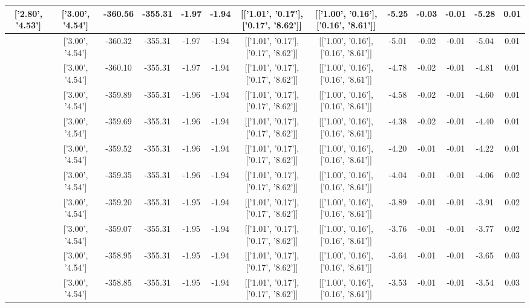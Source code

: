\begin{table}[htbp]
\begin{adjustbox}{angle=90}
\begin{tabular}{|c|c|c|c|c|c|c|c|c|c|c|c|c|}
 ['2.80', '4.53'] & ['3.00', '4.54'] & -360.56 & -355.31 & -1.97 & -1.94 & [['1.01', '0.17'], ['0.17', '8.62']] & [['1.00', '0.16'], ['0.16', '8.61']] & -5.25 & -0.03 & -0.01 & -5.28 & 0.01\\ \hline
 ['2.81', '4.53'] & ['3.00', '4.54'] & -360.32 & -355.31 & -1.97 & -1.94 & [['1.01', '0.17'], ['0.17', '8.62']] & [['1.00', '0.16'], ['0.16', '8.61']] & -5.01 & -0.02 & -0.01 & -5.04 & 0.01\\ \hline
 ['2.82', '4.53'] & ['3.00', '4.54'] & -360.10 & -355.31 & -1.97 & -1.94 & [['1.01', '0.17'], ['0.17', '8.62']] & [['1.00', '0.16'], ['0.16', '8.61']] & -4.78 & -0.02 & -0.01 & -4.81 & 0.01\\ \hline
 ['2.84', '4.53'] & ['3.00', '4.54'] & -359.89 & -355.31 & -1.96 & -1.94 & [['1.01', '0.17'], ['0.17', '8.62']] & [['1.00', '0.16'], ['0.16', '8.61']] & -4.58 & -0.02 & -0.01 & -4.60 & 0.01\\ \hline
 ['2.85', '4.53'] & ['3.00', '4.54'] & -359.69 & -355.31 & -1.96 & -1.94 & [['1.01', '0.17'], ['0.17', '8.62']] & [['1.00', '0.16'], ['0.16', '8.61']] & -4.38 & -0.02 & -0.01 & -4.40 & 0.01\\ \hline
 ['2.86', '4.53'] & ['3.00', '4.54'] & -359.52 & -355.31 & -1.96 & -1.94 & [['1.01', '0.17'], ['0.17', '8.62']] & [['1.00', '0.16'], ['0.16', '8.61']] & -4.20 & -0.01 & -0.01 & -4.22 & 0.01\\ \hline
 ['2.87', '4.53'] & ['3.00', '4.54'] & -359.35 & -355.31 & -1.96 & -1.94 & [['1.01', '0.17'], ['0.17', '8.62']] & [['1.00', '0.16'], ['0.16', '8.61']] & -4.04 & -0.01 & -0.01 & -4.06 & 0.02\\ \hline
 ['2.88', '4.53'] & ['3.00', '4.54'] & -359.20 & -355.31 & -1.95 & -1.94 & [['1.01', '0.17'], ['0.17', '8.62']] & [['1.00', '0.16'], ['0.16', '8.61']] & -3.89 & -0.01 & -0.01 & -3.91 & 0.02\\ \hline
 ['2.90', '4.53'] & ['3.00', '4.54'] & -359.07 & -355.31 & -1.95 & -1.94 & [['1.01', '0.17'], ['0.17', '8.62']] & [['1.00', '0.16'], ['0.16', '8.61']] & -3.76 & -0.01 & -0.01 & -3.77 & 0.02\\ \hline
 ['2.91', '4.53'] & ['3.00', '4.54'] & -358.95 & -355.31 & -1.95 & -1.94 & [['1.01', '0.17'], ['0.17', '8.62']] & [['1.00', '0.16'], ['0.16', '8.61']] & -3.64 & -0.01 & -0.01 & -3.65 & 0.03\\ \hline
 ['2.92', '4.53'] & ['3.00', '4.54'] & -358.85 & -355.31 & -1.95 & -1.94 & [['1.01', '0.17'], ['0.17', '8.62']] & [['1.00', '0.16'], ['0.16', '8.61']] & -3.53 & -0.01 & -0.01 & -3.54 & 0.03\\ \hline

\end{tabular}
\end{adjustbox}
\end{table}

